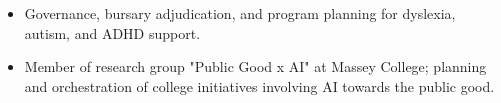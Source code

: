 \begin{itemize}
    \item Governance, bursary adjudication, and program planning for dyslexia, autism, and ADHD support.
\end{itemize}

\begin{itemize}
    \item Member of research group "Public Good x AI" at Massey College; planning and orchestration of college initiatives involving AI towards the public good.
\end{itemize}


%
%

